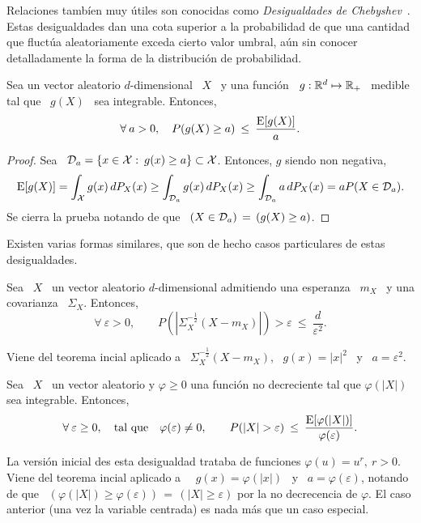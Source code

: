 Relaciones  tamb\'ien muy  \'utiles  son conocidas  como  {\it Desigualdades  de
  Chebyshev}~\cite{Bie53,  Tch67,  Mar84,  OlkPra58,  Fer82,  Nav13,  StePar17}.
Estas desigualdades dan una cota superior  a la probabilidad de que una cantidad
que  fluct\'ua aleatoriamente  exceda  cierto valor  umbral,  a\'un sin  conocer
detalladamente la forma de la distribuci\'on de probabilidad.
%
\begin{teorema}
  Sea un vector aleatorio $d$-dimensional \  $X$ \ y una funci\'on \ $g: \mathbb{R}^d
  \mapsto \mathbb{R}_+$ \ medible tal que \ $g(X)$ \ sea integrable. Entonces,
  \[
  \forall \: a > 0, \quad P(g(X) \ge a) \: \le \: \frac{\operatorname{E}[g(X)]}{a}.
  \]
\end{teorema}
%
\begin{proof}
  Sea \ $\mathcal{D}_a = \{ x \in \mathcal{X}: \: g(x) \ge a \} \subset \mathcal{X}$. Entonces, $g$ siendo non negativa,
  \[
  \operatorname{E}[g(X)]  = \int_{\mathcal{X}}  g(x) \,  dP_X(x) \ge  \int_{\mathcal{D}_a} g(x)  \,  dP_X(x) \ge
  \int_{\mathcal{D}_a} a \, dP_X(x) = a P(X \in \mathcal{D}_a).
  \]
  Se cierra la prueba notando de que \ $(X \in \mathcal{D}_a) \, = \, (g(X) \ge a)$.
\end{proof}
%
Existen varias  formas similares, que son  de hecho casos  particulares de estas
desigualdades.
%
\begin{corolario}
  Sea \  $X$ \  un vector aleatorio  $d$-dimensional admitiendo una  esperanza \
  $m_X$ \ y una covarianza \ $\Sigma_X$. Entonces,
  \[
  \forall \:  \varepsilon > 0,  \qquad P\left( \left| \Sigma_X^{-\frac12}  (X -
      m_X) \right| \right) > \varepsilon \: \le \: \frac{d}{\varepsilon^2}.
 \]
\end{corolario}
%
Viene del teorema incial aplicado a \ $\Sigma_X^{-\frac12} (X - m_X)$, \ $g(x)
= |x|^2$ \ y \ $a = \varepsilon^2$.
%
%
\begin{corolario}[Markov]
  Sea \ $X$ \ un vector aleatorio y $\varphi \ge 0$ una funci\'on no decreciente
  tal que $\varphi(|X|)$ sea integrable. Entonces,
  \[
  \forall \: \varepsilon \ge  0, \quad \mbox{tal que} \quad \varphi(\varepsilon)
  \ne     0,     \qquad     P(|X|     >     \varepsilon)     \:     \le     \:
  \frac{\operatorname{E}[\varphi(|X|)]}{\varphi(\varepsilon)}.
 \]
\end{corolario}
%
La versi\'on  inicial des  esta desigualdad trataba  de funciones  $\varphi(u) =
u^r, \: r > 0$. Viene del teorema  incial aplicado a \ \ $g(x) = \varphi(|x|)$ \
y  \   $a  =  \varphi(\varepsilon)$,   notando  de  que  \   $(\varphi(|X|)  \ge
\varphi(\varepsilon)) \,  = \, (|X| \ge  \varepsilon)$ por la  no decrecencia de
$\varphi$. El caso anterior (una vez  la variable centrada) es nada m\'as que un
caso especial.

